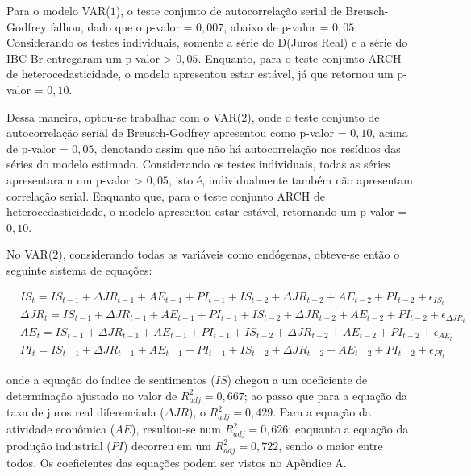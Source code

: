 
Para o modelo VAR($1$), o teste conjunto de autocorrelação serial de Breusch-Godfrey falhou, dado que o p-valor = $0,007$, abaixo de p-valor = $0,05$. Considerando os testes individuais, somente a série do D(Juros Real) e a série do IBC-Br entregaram um p-valor > $0,05$. Enquanto, para o teste conjunto ARCH de heterocedasticidade, o modelo apresentou estar estável, já que retornou um p-valor = $0,10$.

Dessa maneira, optou-se trabalhar com o VAR($2$), onde o teste conjunto de autocorrelação serial de Breusch-Godfrey apresentou como p-valor = $0,10$, acima de p-valor = $0,05$, denotando assim que não há autocorrelação nos resíduos das séries do modelo estimado. Considerando os testes individuais, todas as séries apresentaram um p-valor > $0,05$, isto é, individualmente também não apresentam correlação serial. Enquanto que, para o teste conjunto ARCH de heterocedasticidade, o modelo apresentou estar estável, retornando um p-valor = $0,10$.

No VAR($2$), considerando todas as variáveis como endógenas, obteve-se então o seguinte sistema de equações:

\begin{ceqn}
\begin{align} \label{eq:sist_equacoes_var_2}
&IS_{t} = IS_{t-1} + \Delta JR_{t-1} + AE_{t-1} + PI_{t-1} + IS_{t-2} + \Delta JR_{t-2} + AE_{t-2} + PI_{t-2} + \epsilon_{IS_{t}} \\
&\Delta JR_{t} = IS_{t-1} + \Delta JR_{t-1} + AE_{t-1} + PI_{t-1} + IS_{t-2} + \Delta JR_{t-2} + AE_{t-2} + PI_{t-2} + \epsilon_{\Delta JR_{t}} \\
&AE_{t} = IS_{t-1} + \Delta JR_{t-1} + AE_{t-1} + PI_{t-1} + IS_{t-2} + \Delta JR_{t-2} + AE_{t-2} + PI_{t-2} + \epsilon_{AE_{t}} \\
&PI_{t} = IS_{t-1} + \Delta JR_{t-1} + AE_{t-1} + PI_{t-1} + IS_{t-2} + \Delta JR_{t-2} + AE_{t-2} + PI_{t-2} + \epsilon_{PI_{t}}
\end{align}
\end{ceqn} onde a equação do índice de sentimentos ($IS$) chegou a um coeficiente de determinação ajustado no valor de $R_{adj}^2 = 0,667$; ao passo que para a equação da taxa de juros real diferenciada ($\Delta JR$), o $R_{adj}^2 = 0,429$. Para a equação da atividade econômica ($AE$), resultou-se num $R_{adj}^2 = 0,626$; enquanto a equação da produção industrial ($PI$) decorreu em um $R_{adj}^2 = 0,722$, sendo o maior entre todos. Os coeficientes das equações podem ser vistos no Apêndice A.

